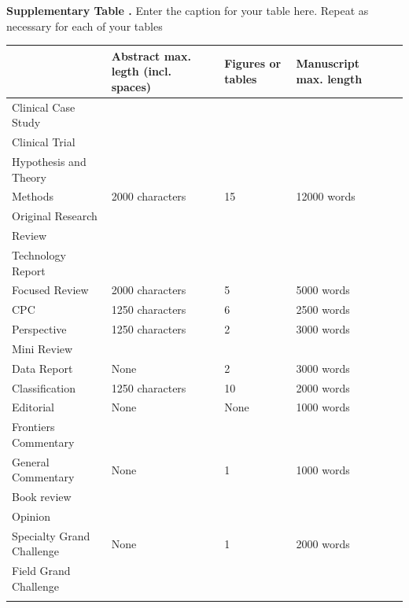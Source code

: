 \documentclass{frontiers_suppmat} %
\begin{document}
\begin{table}[h]
\textbf{\label{Tab:01} Supplementary Table .}{ Enter the caption for your table here.  Repeat as  necessary for each of your tables }

\processtable{ }
{\begin{tabular}{lllll}\toprule
 & Abstract max. legth (incl. spaces) & Figures or tables & Manuscript max. length \\\midrule
Clinical Case Study & & & &\\
Clinical Trial & & & &\\
Hypothesis and Theory & & & &\\
Methods & 2000 characters  & 15 & 12000 words \\
Original Research & & & &\\
Review & & & &\\
Technology Report & & & &\\\midrule
Focused Review & 2000 characters & 5 & 5000 words \\\midrule
CPC &  1250 characters& 6 & 2500 words  \\\midrule
Perspective & 1250 characters & 2 & 3000 words  \\
Mini Review & & & &\\\midrule
Data Report & None & 2 & 3000 words\\\midrule
Classification & 1250 characters & 10 & 2000 words \\\midrule
Editorial & None & None & 1000 words  \\\midrule
Frontiers Commentary  & & &\\
General Commentary & None & 1 & 1000 words\\
Book review & & & \\\midrule
Opinion   & & &\\
Specialty Grand Challenge & None & 1 & 2000 words\\
Field Grand Challenge & & & &\\\botrule
\end{tabular}}{}
\end{table}

\end{document}
